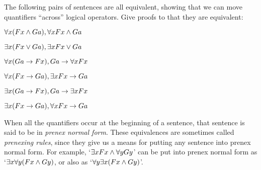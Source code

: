 \problempart
The following pairs of sentences are all equivalent, showing that we can move quantifiers ``across'' logical operators.  Give proofs to that they are equivalent:
\begin{earg}
\item $\forall x (Fx \wedge Ga), \forall x Fx \wedge Ga$
\item $\exists x (Fx \vee Ga), \exists x Fx \vee Ga$
\item $\forall x(Ga \rightarrow Fx), Ga \rightarrow \forall x Fx$
\item $\forall x(Fx \rightarrow Ga), \exists x Fx \rightarrow Ga$
\item $\exists x(Ga \rightarrow Fx), Ga \rightarrow \exists x Fx$
\item $\exists x(Fx \rightarrow Ga), \forall x Fx \rightarrow Ga$
\end{earg}
When all the quantifiers occur at the beginning of a sentence, that sentence is said to be in \emph{prenex normal form}. These equivalences are sometimes called \emph{prenexing rules}, since they give us a means for putting any sentence into prenex normal form. For example, `$\exists x Fx \wedge \forall yGy$' can be put into prenex normal form as `$\exists x\forall y(Fx \wedge Gy)$, or also as `$\forall y \exists x(Fx \wedge Gy)$'.


